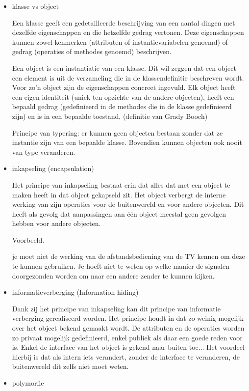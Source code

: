 \begin{itemize}
    \item klasse vs object
    
Een klasse geeft een gedetailleerde beschrijving van een aantal dingen met dezelfde eigenschappen en die hetzelfde gedrag vertonen. Deze eigenschappen kunnen zowel kenmerken (attributen of instantievariabelen genoemd) of gedrag (operaties of methodes genoemd) beschrijven.

Een object is een instantiatie van een klasse. Dit wil zeggen dat een object een element is uit de verzameling die in de klassendefinitie beschreven wordt. Voor zo'n object zijn de eigenschappen concreet ingevuld. Elk object heeft een eigen identiteit (uniek ten opzichte van de andere objecten), heeft een bepaald gedrag (gedefinieerd in de methodes die in de klasse gedefinieerd zijn) en is in een bepaalde toestand, (definitie van Grady Booch)

Principe van typering: er kunnen geen objecten bestaan zonder dat ze instantie zijn van een bepaalde klasse. Bovendien kunnen objecten ook nooit van type veranderen.
    \item inkapseling (encapsulation)
    
    
Het principe van inkapseling bestaat erin dat alles dat met een object te maken heeft in dat object gekapseld zit. Het object verbergt de interne werking van zijn operaties voor de buitenwereld en voor andere objecten. Dit heeft als gevolg dat aanpassingen aan één object meestal geen gevolgen hebben voor andere objecten.

Voorbeeld. 

je moet niet de werking van de afstandsbediening van de TV kennen om deze te kunnen gebruiken. Je hoeft niet te weten op welke manier de signalen doorgezonden worden om naar een andere zender te kunnen kijken.
    \item informatieverberging (Information hiding)
    
Dank zij het principe van inkapseling kan dit principe van informatie verberging gerealiseerd worden. Het principe houdt in dat zo weinig mogelijk over het object bekend gemaakt wordt. De attributen en de operaties worden zo privaat mogelijk gedefinieerd, enkel publiek als daar een goede reden voor is. Enkel de interface van het object is gekend naar buiten toe...
Het voordeel hierbij is dat als intern iets verandert, zonder de interface te veranderen, de buitenwereld dit zelfs niet moet weten.
    \item polymorfie
    

\end{itemize}
